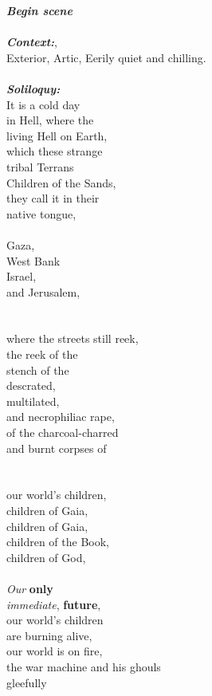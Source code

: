 \documentclass[16pt,openany,oneside]{book}
\begin{document}
\noindent\textbf{\textit{Begin scene}}
\\\\
\textbf{\textit{Context:}}, \\ 
Exterior, Artic, Eerily quiet and chilling.
\\\\
\textbf{\textit{Soliloquy:}} \\ 
It is a cold day \\  
in Hell, where the \\  
living Hell on Earth, \\  
which these strange \\  
tribal Terrans \\   
Children of the Sands, \\  
they call it in their \\   
native tongue,
\\\\
Gaza, \\  
West Bank \\  
Israel, \\  
and Jerusalem, \\
\\\\
where the streets still reek, \\
the reek of the \\ 
stench of the \\ 
descrated, \\ 
multilated, \\ 
and necrophiliac rape, \\ 
of the charcoal-charred \\ 
and burnt corpses of \\ 
\\\\
our world's children, \\ 
children of Gaia, \\  
children of Gaia, \\  
children of the Book, \\ 
children of God, 
\\\\
\textit{Our} \textbf{only} \\   
\textit{immediate}, \textbf{future}, \\ 
our world's children \\
are burning alive, \\ 
our world is on fire, \\
the war machine and his ghouls \\
gleefully 
\end{document}
